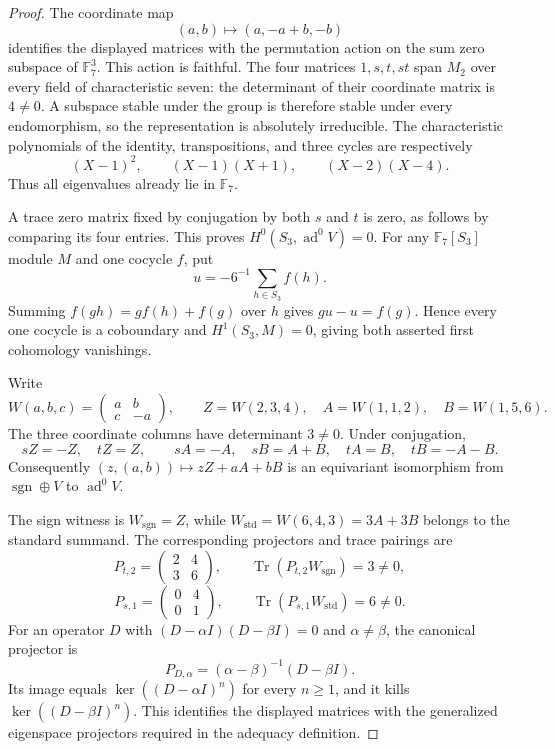 \documentclass[11pt]{amsart}
\theoremstyle{definition}
\theoremstyle{remark}
\newcommand{\FF}{\mathbb F}
\newcommand{\Tr}{\operatorname{Tr}}
\newcommand{\ad}{\operatorname{ad}}
\begin{document}
\begin{proof}
The coordinate map
\[
(a,b)\longmapsto(a,-a+b,-b)
\]
identifies the displayed matrices with the permutation action on the sum zero subspace of \(\FF_7^3\). This action is faithful. The four matrices \(1,s,t,st\) span \(M_2\) over every field of characteristic seven: the determinant of their coordinate matrix is \(4\ne0\). A subspace stable under the group is therefore stable under every endomorphism, so the representation is absolutely irreducible. The characteristic polynomials of the identity, transpositions, and three cycles are respectively
\[
(X-1)^2,\qquad (X-1)(X+1),\qquad (X-2)(X-4).
\]
Thus all eigenvalues already lie in \(\FF_7\).

A trace zero matrix fixed by conjugation by both \(s\) and \(t\) is zero, as follows by comparing its four entries. This proves \(H^0(S_3,\ad^0V)=0\). For any \(\FF_7[S_3]\) module \(M\) and one cocycle \(f\), put
\[
u=-6^{-1}\sum_{h\in S_3}f(h).
\]
Summing \(f(gh)=g f(h)+f(g)\) over \(h\) gives \(gu-u=f(g)\). Hence every one cocycle is a coboundary and \(H^1(S_3,M)=0\), giving both asserted first cohomology vanishings.

Write
\[
W(a,b,c)=\begin{pmatrix}a&b\\c&-a\end{pmatrix},
\qquad
Z=W(2,3,4),\quad A=W(1,1,2),\quad B=W(1,5,6).
\]
The three coordinate columns have determinant \(3\ne0\). Under conjugation,
\[
sZ=-Z,\quad tZ=Z,\qquad
sA=-A,\quad sB=A+B,\quad tA=B,\quad tB=-A-B.
\]
Consequently \((z,(a,b))\mapsto zZ+aA+bB\) is an equivariant isomorphism from \(\operatorname{sgn}\oplus V\) to \(\ad^0V\).

The sign witness is \(W_{\mathrm{sgn}}=Z\), while
\(W_{\mathrm{std}}=W(6,4,3)=3A+3B\) belongs to the standard summand. The corresponding projectors and trace pairings are
\[
P_{t,2}=\begin{pmatrix}2&4\\3&6\end{pmatrix},
\qquad \Tr(P_{t,2}W_{\mathrm{sgn}})=3\ne0,
\]
\[
P_{s,1}=\begin{pmatrix}0&4\\0&1\end{pmatrix},
\qquad \Tr(P_{s,1}W_{\mathrm{std}})=6\ne0.
\]
For an operator \(D\) with \((D-\alpha I)(D-\beta I)=0\) and \(\alpha\ne\beta\), the canonical projector is
\[
P_{D,\alpha}=(\alpha-\beta)^{-1}(D-\beta I).
\]
Its image equals \(\ker((D-\alpha I)^n)\) for every \(n\ge1\), and it kills \(\ker((D-\beta I)^n)\). This identifies the displayed matrices with the generalized eigenspace projectors required in the adequacy definition.


\end{proof}
\end{document}
